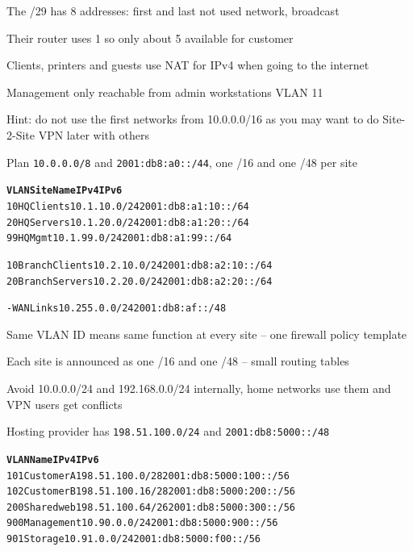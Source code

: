 \documentclass[Screen16to9,17pt]{foils}
\begin{document}
\begin{list2}
\item The /29 has 8 addresses: first and last not used network, broadcast
\item Their router uses 1 so only about 5 available for customer
\item Clients, printers and guests use NAT for IPv4 when going to the internet
\item Management only reachable from admin workstations VLAN 11
\item Hint: do not use the first networks from 10.0.0.0/16 as you may want to do Site-2-Site VPN later with others
\end{list2}


  Plan \verb+10.0.0.0/8+ and \verb+2001:db8:a0::/44+, one /16 and one /48 per site

  \begin{alltt}\small
  \textbf{VLAN Site    Name     IPv4             IPv6}
  10   HQ      Clients  10.1.10.0/24     2001:db8:a1:10::/64
  20   HQ      Servers  10.1.20.0/24     2001:db8:a1:20::/64
  99   HQ      Mgmt     10.1.99.0/24     2001:db8:a1:99::/64

  10   Branch  Clients  10.2.10.0/24     2001:db8:a2:10::/64
  20   Branch  Servers  10.2.20.0/24     2001:db8:a2:20::/64

  -    WAN     Links    10.255.0.0/24    2001:db8:af::/48
  \end{alltt}

  \begin{list2}
  \item Same VLAN ID means same function at every site -- one firewall policy template
  \item Each site is announced as one /16 and one /48 -- small routing tables
  \item Avoid 10.0.0.0/24 and 192.168.0.0/24 internally, home networks use them and VPN users get conflicts
  \end{list2}






  Hosting provider has \verb+198.51.100.0/24+ and \verb+2001:db8:5000::/48+

  \begin{alltt}\small
  \textbf{VLAN Name         IPv4                IPv6}
  101  Customer A   198.51.100.0/28     2001:db8:5000:100::/56
  102  Customer B   198.51.100.16/28    2001:db8:5000:200::/56
  200  Shared web   198.51.100.64/26    2001:db8:5000:300::/56
  900  Management   10.90.0.0/24        2001:db8:5000:900::/56
  901  Storage      10.91.0.0/24        2001:db8:5000:f00::/56
  \end{alltt}
\end{document}
